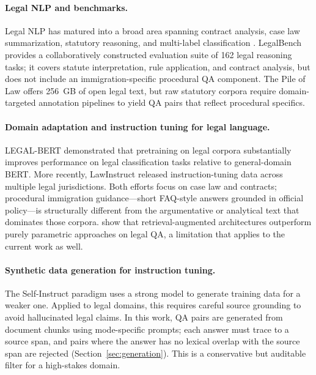\documentclass[11pt]{article}
\begin{document}
\paragraph{Legal NLP and benchmarks.}
Legal NLP has matured into a broad area spanning contract analysis, case law summarization, statutory reasoning, and multi-label classification \citep{chalkidis2020legalbert,hendrycks2021cuad,chalkidis2021multieurlex}. LegalBench \citep{guha2023legalbench} provides a collaboratively constructed evaluation suite of 162 legal reasoning tasks; it covers statute interpretation, rule application, and contract analysis, but does not include an immigration-specific procedural QA component. The Pile of Law \citep{pile-of-law} offers 256~GB of open legal text, but raw statutory corpora require domain-targeted annotation pipelines to yield QA pairs that reflect procedural specifics.

\paragraph{Domain adaptation and instruction tuning for legal language.}
LEGAL-BERT \citep{chalkidis2020legalbert} demonstrated that pretraining on legal corpora substantially improves performance on legal classification tasks relative to general-domain BERT. More recently, LawInstruct \citep{zheng2023lawinstruct} released instruction-tuning data across multiple legal jurisdictions. Both efforts focus on case law and contracts; procedural immigration guidance---short FAQ-style answers grounded in official policy---is structurally different from the argumentative or analytical text that dominates those corpora. \citet{mahari2024legalsifter} show that retrieval-augmented architectures outperform purely parametric approaches on legal QA, a limitation that applies to the current work as well.

\paragraph{Synthetic data generation for instruction tuning.}
The Self-Instruct paradigm \citep{wei2022finetuned,ouyang2022instructgpt} uses a strong model to generate training data for a weaker one. Applied to legal domains, this requires careful source grounding to avoid hallucinated legal claims. In this work, QA pairs are generated from document chunks using mode-specific prompts; each answer must trace to a source span, and pairs where the answer has no lexical overlap with the source span are rejected (Section~\ref{sec:generation}). This is a conservative but auditable filter for a high-stakes domain.
\end{document}
